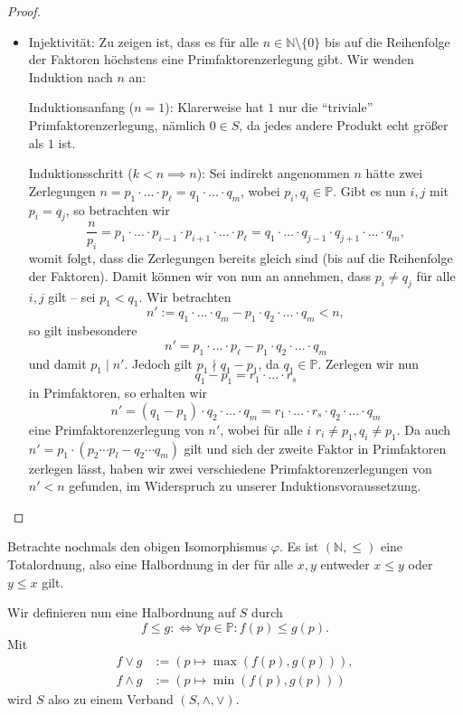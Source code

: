 \begin{proof}
\begin{itemize}
        \item Injektivität: Zu zeigen ist, dass es für alle $n \in \mathbb{N} \setminus \{0\}$ bis auf die Reihenfolge der Faktoren höchstens eine Primfaktorenzerlegung gibt. Wir wenden Induktion nach $n$ an:
        
        Induktionsanfang ($n=1$): Klarerweise hat $1$ nur die ``triviale'' Primfaktorenzerlegung, nämlich $0 \in S$, da jedes andere Produkt echt größer als $1$ ist.

        Induktionsschritt ($k<n \implies n$): Sei indirekt angenommen $n$ hätte zwei Zerlegungen $n = p_1 \cdot ... \cdot p_\ell = q_1 \cdot ... \cdot q_m$, wobei $p_i, q_i \in \mathbb{P}$. Gibt es nun $i,j$ mit $p_i = q_j$, so betrachten wir
        $$ \frac{n}{p_i} = p_1 \cdot ... \cdot p_{i-1} \cdot p_{i+1} \cdot ... \cdot p_\ell = q_1 \cdot ... \cdot q_{j-1} \cdot q_{j+1} \cdot ... \cdot q_m, $$
        womit folgt, dass die Zerlegungen bereits gleich sind (bis auf die Reihenfolge der Faktoren). Damit können wir von nun an annehmen, dass $p_i \neq q_j$ für alle $i, j$ gilt -- \obda sei $p_1 < q_1$. Wir betrachten
        $$ n' := q_1 \cdot ... \cdot q_m - p_1 \cdot q_2 \cdot ... \cdot q_m < n, $$
        so gilt insbesondere
        $$ n' = p_1 \cdot ... \cdot p_\ell - p_1 \cdot q_2 \cdot ... \cdot q_m $$
        und damit $p_1 \mid n'$. Jedoch gilt $p_1 \nmid q_1 - p_1$, da $q_1 \in \mathbb{P}$. Zerlegen wir nun
        $$ q_1 - p_1 = r_1 \cdot ... \cdot r_s $$
        in Primfaktoren, so erhalten wir
        $$ n' = (q_1 - p_1) \cdot q_2 \cdot ... \cdot q_m = r_1 \cdot ... \cdot r_s \cdot q_2 \cdot ... \cdot q_m $$ eine Primfaktorenzerlegung von $n'$, wobei für alle $i$ $r_i \neq p_1, q_i \neq p_1$. Da auch $n'=p_1\cdot(p_2\cdots p_l-q_2\cdots q_m)$ gilt und sich der zweite Faktor in Primfaktoren zerlegen lässt, haben wir zwei verschiedene Primfaktorenzerlegungen von $n' < n$ gefunden, im Widerspruch zu unserer Induktionsvoraussetzung.
    \end{itemize}
\end{proof}

\begin{remark}
    Betrachte nochmals den obigen Isomorphismus $\varphi$. Es ist $(\mathbb{N}, \leq)$ eine Totalordnung, also eine Halbordnung in der für alle $x,y$ entweder $x \leq y$ oder $y \leq x$ gilt.

    Wir definieren nun eine Halbordnung auf $S$ durch
    $$ f \leq g :\Leftrightarrow \forall p \in \mathbb{P}: f(p) \leq g(p). $$
    Mit 
    \begin{align*}
        f \vee g &:= (p \mapsto \max(f(p),g(p))), \\ f \wedge g &:= (p \mapsto \min(f(p),g(p)))
    \end{align*}
    wird $S$ also zu einem Verband $(S, \land, \lor)$.
\end{remark}

